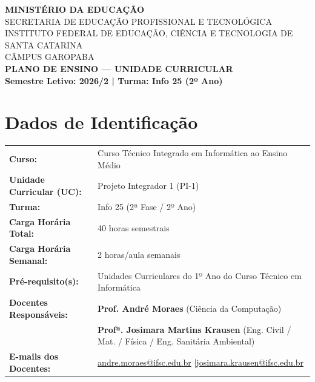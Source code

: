 \documentclass[12pt,a4paper]{article}
\begin{document}
\begin{center}
    {\Large \textbf{MINISTÉRIO DA EDUCAÇÃO}}\\
    {\large SECRETARIA DE EDUCAÇÃO PROFISSIONAL E TECNOLÓGICA}\\
    {\large INSTITUTO FEDERAL DE EDUCAÇÃO, CIÊNCIA E TECNOLOGIA DE SANTA CATARINA}\\
    {\large CÂMPUS GAROPABA}\\[0.4cm]
    {\Large \textbf{PLANO DE ENSINO — UNIDADE CURRICULAR}}\\[0.2cm]
    {\large \textbf{Semestre Letivo: 2026/2 | Turma: Info 25 (2º Ano)}}
\end{center}

\vspace{0.3cm}

\section{Dados de Identificação}

\begin{table}[H]
\centering
\small
{}
\begin{tabularx}{\textwidth}{|l|X|}
\hline
\rowcolor{cinzaCabecalho}
\multicolumn{2}{|c|}{\textbf{INFORMAÇÕES DA UNIDADE CURRICULAR}} \\ \hline
\textbf{Curso:} & Curso Técnico Integrado em Informática ao Ensino Médio \\ \hline
\textbf{Unidade Curricular (UC):} & Projeto Integrador 1 (PI-1) \\ \hline
\textbf{Turma:} & Info 25 (2ª Fase / 2º Ano) \\ \hline
\textbf{Carga Horária Total:} & 40 horas semestrais \\ \hline
\textbf{Carga Horária Semanal:} & 2 horas/aula semanais \\ \hline
\textbf{Pré-requisito(s):} & Unidades Curriculares do 1º Ano do Curso Técnico em Informática \\ \hline
\textbf{Docentes Responsáveis:} & \textbf{Prof. André Moraes} (Ciência da Computação)\\
 & \textbf{Profª. Josimara Martins Krausen} (Eng. Civil / Mat. / Física / Eng. Sanitária Ambiental) \\ \hline
\textbf{E-mails dos Docentes:} & \url{andre.moraes@ifsc.edu.br} \quad|\quad \url{josimara.krausen@ifsc.edu.br} \\ \hline
\end{tabularx}
\end{table}
\end{document}
